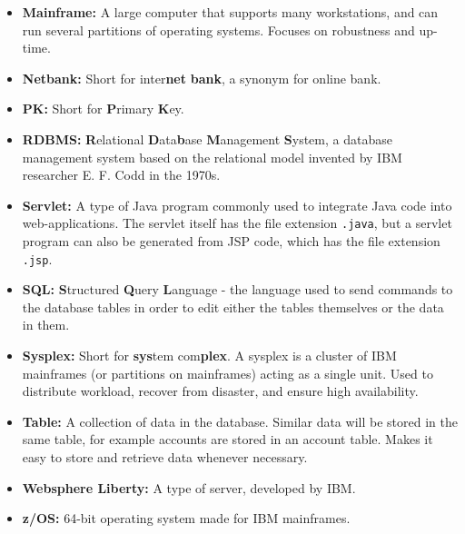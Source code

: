 \begin{itemize}
    \item \textbf{Mainframe:} A large computer that supports many workstations, and can run several partitions of operating systems. Focuses on robustness and up-time.
    
    \item \textbf{Netbank:} Short for inter\textbf{net} \textbf{bank}, a synonym for online bank.
    
    \item \textbf{PK:} Short for \textbf{P}rimary \textbf{K}ey.
    
    \item \textbf{RDBMS:} \textbf{R}elational \textbf{D}ata\textbf{b}ase \textbf{M}anagement \textbf{S}ystem, a database management system based on the relational model invented by IBM researcher E. F. Codd in the 1970s.

    \item \textbf{Servlet:} A type of Java program commonly used to integrate Java code into web-applications. The servlet itself has the file extension \texttt{.java}, but a servlet program can also be generated from JSP code, which has the file extension \texttt{.jsp}. 
    
    \item \textbf{SQL:} \textbf{S}tructured \textbf{Q}uery \textbf{L}anguage - the language used to send commands to the database tables in order to edit either the tables themselves or the data in them.
    
    \item \textbf{Sysplex:} Short for \textbf{sys}tem com\textbf{plex}. A sysplex is a cluster of IBM mainframes (or partitions on mainframes) acting as a single unit. Used to distribute workload, recover from disaster, and ensure high availability.
    
    \item \textbf{Table:} A collection of data in the database. Similar data will be stored in the same table, for example accounts are stored in an account table. Makes it easy to store and retrieve data whenever necessary.
    
    \item \textbf{Websphere Liberty:} A type of server, developed by IBM. %
    
    \item \textbf{z/OS:} 64-bit operating system made for IBM mainframes.
        
\end{itemize}



